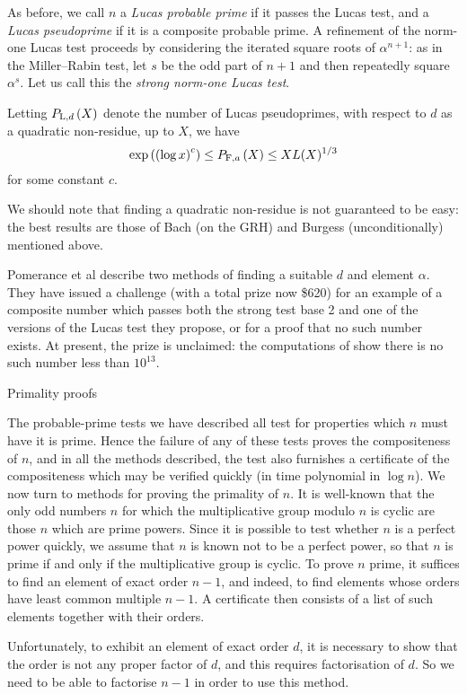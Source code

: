 As before, we call $n$ a {\it Lucas probable prime} if it passes the Lucas test,
and a {\it Lucas pseudoprime} if it is a composite probable prime.
A refinement of the norm-one Lucas test proceeds by considering the iterated square roots
of $\alpha^{n+1}$: as in the Miller--Rabin test, let $s$ be the odd
part of $n+1$ and then repeatedly square $\alpha^s$.  Let us call this the
{\it strong norm-one Lucas test}.

Letting $\P L,d(X)$ denote the number of Lucas pseudoprimes, with respect to $d$ as
a quadratic non-residue, up to $X$, we have
$$
\exp\left({\left(\log x\right)^c}\right) \le \P F,a(X) \le X L(X)^{1/3}
$$
for some constant $c$.

We should note that finding a quadratic non-residue is not guaranteed to be easy:
the best results are those of Bach (on the GRH) and Burgess (unconditionally)
mentioned above.

Pomerance et al \cite{34} describe two methods of finding a suitable $d$ and
element $\alpha$.  They have issued a challenge (with a total prize now \$620)
for an example of a composite number which passes both the strong test base 2
and one of the versions of the Lucas test they propose, or for a proof that no
such number exists.  At present, the prize is unclaimed: the computations 
of \cite{32,33} show there is no such number less than $10^{13}$.

\subhead Primality proofs \endsubhead

The probable-prime tests we have described all test for properties which $n$ must
have it is prime.  Hence the failure of any of these tests proves the compositeness
of $n$, and in all the methods described, the test also furnishes a certificate 
of the compositeness which may be verified quickly (in time polynomial in $\log n$).  
We now turn
to methods for proving the primality of $n$.  It is well-known that the only odd
numbers $n$ for which the multiplicative group modulo $n$ is cyclic are those $n$
which are prime powers.  Since it is possible to test whether $n$ is a
perfect power quickly, we assume that $n$ is known not to be a perfect power,
so that $n$ is prime if and only if the multiplicative group is cyclic.  To prove
$n$ prime, it suffices to find an element of exact order $n-1$, and indeed, to
find elements whose orders have least common multiple $n-1$.  
A certificate then consists of a list of such elements together with their orders.

Unfortunately, to exhibit an element of exact order $d$, it is necessary to show
that the order is not any proper factor of $d$, and this requires factorisation
of $d$.  So we need to be able to factorise $n-1$ in order to use this method.

